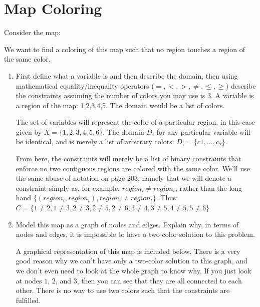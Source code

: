 \documentclass[12pt]{article}
\begin{document}
\section{Map Coloring}

Consider the map:



\noindent
We want to find a coloring of this map such that no region touches a
region of the same color.

\begin{enumerate} 

\item First define what a variable is and then describe the domain,
  then using mathematical equality/inequality operators ($=, <, >,
  \neq, \leq, \geq$) describe the constraints assuming the number of
  colors you may use is 3.  A variable is a region of the map:
  1,2,3,4,5.  The domain would be a list of colors.

\begin{solution}
The set of variables will represent the color of a particular region, in this case given by $X = \{1,2,3,4,5,6\}$. The domain $D_i$ for any particular variable will be identical, and is merely a list of arbitrary colors: $D_i = \{ c1, \ldots, c_2 \}$. \newline

From here, the constraints will merely be a list of binary constraints that enforce no two contiguous regions are colored with the same color. We'll use the same abuse of notation on page 203, namely that we will denote a constraint simply as, for example, $region_i \neq region_t$, rather than the long hand $\{ (region_i, region_t), region_i \neq region_t \}$. Thus: $C = \{ 1 \neq 2, 1 \neq 3, 2 \neq 3, 2 \neq 5, 2 \neq 6, 3 \neq 4, 3 \neq 5, 4 \neq 5, 5 \neq 6 \}$
\end{solution}

\item Model this map as a graph of nodes and edges.  Explain why, in
  terms of nodes and edges, it is impossible to have a two color
  solution to this problem.

\begin{solution}
A graphical representation of this map is included below. There is a very good reason why we can't have only a two-color solution to this graph, and we don't even need to look at the whole graph to know why. If you just look at nodes $1$, $2$, and $3$, then you can see that they are all connected to each other. There is no way to use two colors such that the constraints are fulfilled. \newline


\end{solution}
\end{enumerate}
\end{document}
